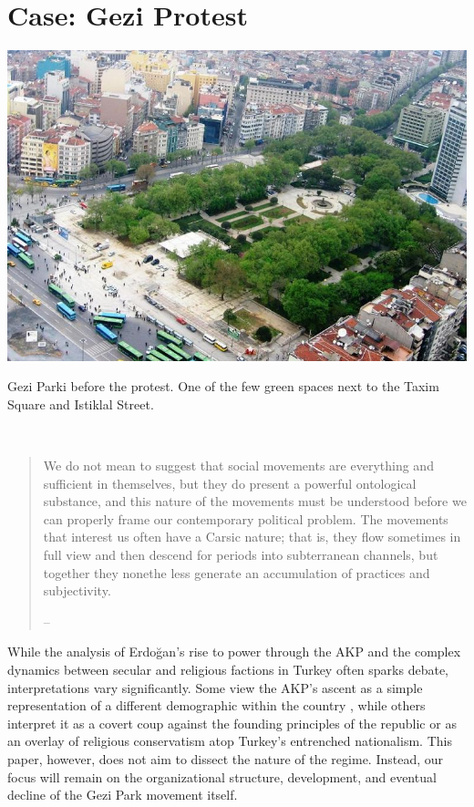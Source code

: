 \chapter{Case: Gezi Protest}
\label{cha:gezi}

\begin{marginfigure}
  \includegraphics[scale=0.28]{Gezi_Parki.jpg}
  \caption{Gezi Parki before the protest. One of the few green spaces next to
  the Taxim Square and Istiklal Street.}\\
\end{marginfigure}

\begin{quote}
  We do not mean to suggest that social movements are everything and sufficient in themselves, but they do present a powerful ontological substance, and this nature of the movements must be understood before we can properly frame our contemporary political problem. The movements that interest us often have a Carsic nature; that is, they flow sometimes in full view and then descend for periods into subterranean channels, but together they nonethe­ less generate an accumulation of practices and subjectivity.

  -- \cite[67]{hardt2017}
\end{quote}

While the analysis of Erdoğan's rise to power through the AKP and the complex dynamics between secular and religious factions in Turkey often sparks debate, interpretations vary significantly. Some view the AKP's ascent as a simple representation of a different demographic within the country \parencite{defneover2017}, while others interpret it as a covert coup against the founding principles of the republic or as an overlay of religious conservatism atop Turkey’s entrenched nationalism. This paper, however, does not aim to dissect the nature of the regime. Instead, our focus will remain on the organizational structure, development, and eventual decline of the Gezi Park movement itself.

